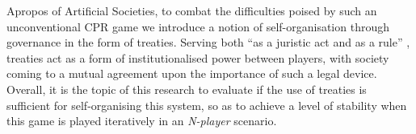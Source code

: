 Apropos of Artificial Societies, to combat the difficulties poised by such an unconventional CPR game we introduce a notion of self-organisation through governance in the form of treaties. Serving both ``as a juristic act and as a rule'' \cite{reuter1995introduction}, treaties act as a form of institutionalised power between players, with society coming to a mutual agreement upon the importance of such a legal device. Overall, it is the topic of this research to evaluate if the use of treaties is sufficient for self-organising this system, so as to achieve a level of stability when this game is played iteratively in an \textit{N-player} scenario.